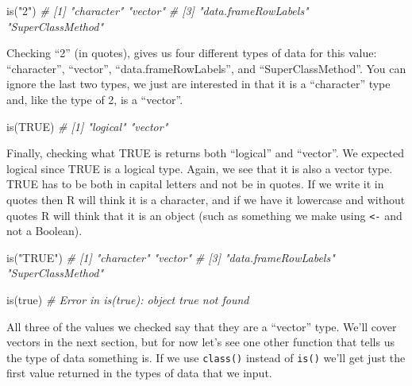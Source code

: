 \documentclass[
  a4paper,
]{krantz}
\makeatletter
\newenvironment{Shaded}{\begin{snugshade}}{\end{snugshade}}
\newcommand{\CommentTok}[1]{\textcolor[rgb]{0.37,0.37,0.37}{\textit{#1}}}
\newcommand{\ConstantTok}[1]{\textcolor[rgb]{0,0,0}{#1}}
\newcommand{\FunctionTok}[1]{\textcolor[rgb]{0,0,0}{#1}}
\newcommand{\NormalTok}[1]{#1}
\newcommand{\StringTok}[1]{\textcolor[rgb]{0.5,0.5,0.5}{#1}}
\newenvironment{kframe}{%
\medskip{}
\setlength{\fboxsep}{.8em}
 \def\at@end@of@kframe{}%
 \ifinner\ifhmode%
  \def\at@end@of@kframe{\end{minipage}}%
  \begin{minipage}{\columnwidth}%
 \fi\fi%
 \def\FrameCommand##1{\hskip\@totalleftmargin \hskip-\fboxsep
 \colorbox{shadecolor}{##1}\hskip-\fboxsep
     \hskip-\linewidth \hskip-\@totalleftmargin \hskip\columnwidth}%
 \MakeFramed {\advance\hsize-\width
   \@totalleftmargin\z@ \linewidth\hsize
   \@setminipage}}%
 {\par\unskip\endMakeFramed%
 \at@end@of@kframe}
\renewenvironment{Shaded}{\begin{kframe}}{\end{kframe}}
\makeatother
\begin{document}
\begin{Shaded}
\begin{Highlighting}[]
\FunctionTok{is}\NormalTok{(}\StringTok{"2"}\NormalTok{)}
\CommentTok{\# [1] "character"           "vector"             }
\CommentTok{\# [3] "data.frameRowLabels" "SuperClassMethod"}
\end{Highlighting}
\end{Shaded}

Checking ``2'' (in quotes), gives us four different types of
data for this value: ``character'', ``vector'',
``data.frameRowLabels'', and ``SuperClassMethod''. You can
ignore the last two types, we just are interested in that it
is a ``character'' type and, like the type of 2, is a
``vector''.

\begin{Shaded}
\begin{Highlighting}[]
\FunctionTok{is}\NormalTok{(}\ConstantTok{TRUE}\NormalTok{)}
\CommentTok{\# [1] "logical" "vector"}
\end{Highlighting}
\end{Shaded}

Finally, checking what TRUE is returns both ``logical'' and
``vector''. We expected logical since TRUE is a logical
type. Again, we see that it is also a vector type. TRUE has
to be both in capital letters and not be in quotes. If we
write it in quotes then R will think it is a character, and
if we have it lowercase and without quotes R will think that
it is an object (such as something we make using
\texttt{\textless{}-} and not a Boolean).

\begin{Shaded}
\begin{Highlighting}[]
\FunctionTok{is}\NormalTok{(}\StringTok{"TRUE"}\NormalTok{)}
\CommentTok{\# [1] "character"           "vector"             }
\CommentTok{\# [3] "data.frameRowLabels" "SuperClassMethod"}
\end{Highlighting}
\end{Shaded}

\begin{Shaded}
\begin{Highlighting}[]
\FunctionTok{is}\NormalTok{(true)}
\CommentTok{\# Error in is(true): object \textquotesingle{}true\textquotesingle{} not found}
\end{Highlighting}
\end{Shaded}

All three of the values we checked say that they are a
``vector'' type. We'll cover vectors in the next section,
but for now let's see one other function that tells us the
type of data something is. If we use \texttt{class()}
instead of \texttt{is()} we'll get just the first value
returned in the types of data that we input.
\end{document}
